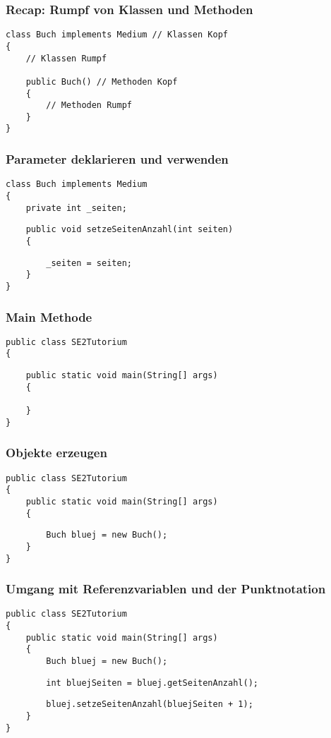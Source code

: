 \documentclass[mathserif]{beamer}
\begin{document}
\begin{frame}[fragile]
    \frametitle{Recap: Rumpf von Klassen und Methoden}
    \begin{lstlisting}
class Buch implements Medium // Klassen Kopf
{
    // Klassen Rumpf

    public Buch() // Methoden Kopf
    {
        // Methoden Rumpf
    }
}
    \end{lstlisting}
\end{frame}

\begin{frame}[fragile]
\frametitle{Parameter deklarieren und verwenden}
    \begin{lstlisting}
class Buch implements Medium
{
    private int _seiten;
    \end{lstlisting}
    \pause
    \begin{lstlisting}
    public void setzeSeitenAnzahl(int seiten)
    {
    \end{lstlisting}
    \pause
    \begin{lstlisting}
        _seiten = seiten;
    }
}
    \end{lstlisting}
\end{frame}

\begin{frame}[fragile]
    \frametitle{Main Methode}
    \begin{lstlisting}
public class SE2Tutorium
{
    \end{lstlisting}
    \pause
    \begin{lstlisting}
    public static void main(String[] args)
    {

    }
}
    \end{lstlisting}
\end{frame}

\begin{frame}[fragile]
\frametitle{Objekte erzeugen}
    \begin{lstlisting}
public class SE2Tutorium
{
    public static void main(String[] args)
    {
    \end{lstlisting}
    \pause
    \begin{lstlisting}
        Buch bluej = new Buch();
    }
}
    \end{lstlisting}
\end{frame}

\begin{frame}[fragile]
\frametitle{Umgang mit Referenzvariablen und der Punktnotation}
    \begin{lstlisting}
public class SE2Tutorium
{
    public static void main(String[] args)
    {
        Buch bluej = new Buch();
    \end{lstlisting}
    \pause
    \begin{lstlisting}
        int bluejSeiten = bluej.getSeitenAnzahl();
    \end{lstlisting}
    \pause
    \begin{lstlisting}
        bluej.setzeSeitenAnzahl(bluejSeiten + 1);
    }
}
    \end{lstlisting}
\end{frame}
\end{document}
